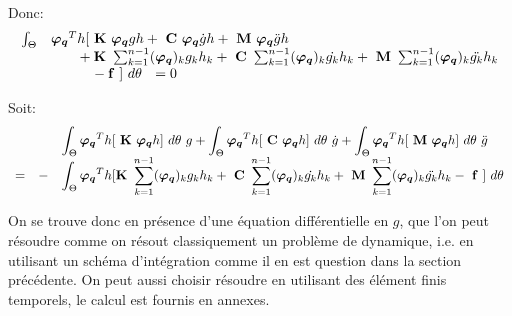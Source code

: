 \documentclass[12pt,a4paper]{report}
\begin{document}
Donc:
\begin{equation}
\begin{array}{r l}
	\int_\Theta&		
		\boldsymbol{\varphi_q}^Th [    ~\mathbf{K}~ \boldsymbol{\varphi_q}gh
				+ ~\mathbf{C}~ \boldsymbol{\varphi_q}  \dot{g}h 
				+ ~\mathbf{M}~ \boldsymbol{\varphi_q} \ddot{g}h 
	\\
	  &
		\phantom{\boldsymbol{\varphi_q}h
			}+ \mathbf{K}~ \sum_{k=1}^{n-1} (\boldsymbol{\varphi_q})_k       g_k  h_k 
			+ ~\mathbf{C}~ \sum_{k=1}^{n-1} (\boldsymbol{\varphi_q})_k  \dot{g_k} h_k 
			+ ~\mathbf{M}~ \sum_{k=1}^{n-1} (\boldsymbol{\varphi_q})_k \ddot{g_k} h_k
	\\
	  &
		\phantom{\boldsymbol{\varphi_q}^{*T}h} -\mathbf{f}~] ~d\theta ~~=0
\end{array}
\end{equation}

Soit:
\begin{equation}
\begin{array}{r r l}
	&& \displaystyle
		\int_\Theta		
			\boldsymbol{\varphi_q}^Th [    ~\mathbf{K}~ \boldsymbol{\varphi_q}h ] ~d\theta
	~g
	+ 
		\int_\Theta		
			\boldsymbol{\varphi_q}^Th [ ~\mathbf{C}~ \boldsymbol{\varphi_q}h ] ~d\theta
	  ~\dot{g}
	+ 
		\int_\Theta		
			\boldsymbol{\varphi_q}^Th [ ~\mathbf{M}~ \boldsymbol{\varphi_q}h ] ~d\theta
	  ~\ddot{g}
	\\
	= &-& \displaystyle
		\int_\Theta		
			\boldsymbol{\varphi_q}^Th [  \mathbf{K}~ \sum_{k=1}^{n-1} (\boldsymbol{\varphi_q})_k       g_k  h_k 
				+ ~\mathbf{C}~ \sum_{k=1}^{n-1} (\boldsymbol{\varphi_q})_k  \dot{g_k} h_k 
				+ ~\mathbf{M}~ \sum_{k=1}^{n-1} (\boldsymbol{\varphi_q})_k \ddot{g_k} h_k
				- ~\mathbf{f}~ ] ~d\theta
\end{array}
\end{equation}

On se trouve donc en présence d'une équation différentielle en $g$, que l'on peut résoudre comme on résout classiquement un problème de dynamique, i.e. en utilisant un schéma d'intégration comme il en est question dans la section précédente. On peut aussi choisir résoudre en utilisant des élément finis temporels, le calcul est fournis en annexes.
\end{document}
